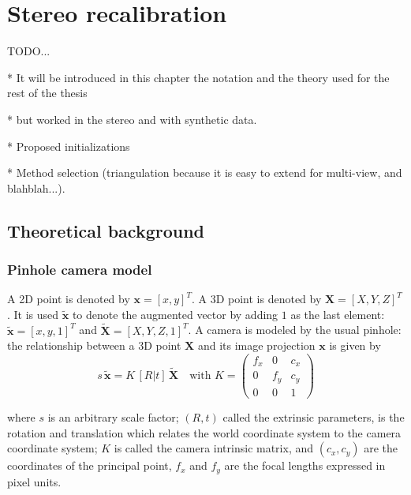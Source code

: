 \chapter{Stereo recalibration}
\label{cha:stereo_recalibration}

TODO...

* It will be introduced in this chapter the notation and the theory used for the rest of the thesis

* but worked in the stereo and with synthetic data.

* Proposed initializations

* Method selection (triangulation because it is easy to extend for multi-view, and blahblah...).


\section{Theoretical background}
\label{sec:theoretical_background}

\subsection{Pinhole camera model}

A 2D point is denoted by $\mathbf{x} = [x,y]^T$. A 3D point is denoted by $\mathbf{X} = [X,Y,Z]^T$. It is used $\mathbf{\tilde{x}}$ to denote the augmented vector by adding $1$ as the last element: $\mathbf{\tilde{x}} = [x,y,1]^T$ and $\mathbf{\tilde{X}} = [X,Y,Z,1]^T$. A camera is modeled by the usual pinhole: the relationship between a 3D point $\mathbf{X}$ and its image projection $\mathbf{x}$ is given by
\begin{equation}
  s\,\mathbf{\tilde{x}} = K\, [R | t]\,\mathbf{\tilde{X}} \quad \mbox{with } K =
    \begin{pmatrix}
      f_x & 0   & c_x \\
      0   & f_y & c_y \\
      0   & 0   & 1
\end{pmatrix}
\end{equation}

\noindent
where $s$ is an arbitrary scale factor; $(R,t)$ called the extrinsic parameters, is the rotation and translation which relates the world coordinate system to the camera coordinate system; $K$ is called the camera intrinsic matrix, and $(c_x,c_y)$ are the coordinates of the principal point, $f_x$ and $f_y$ are the focal lengths expressed in pixel units.




